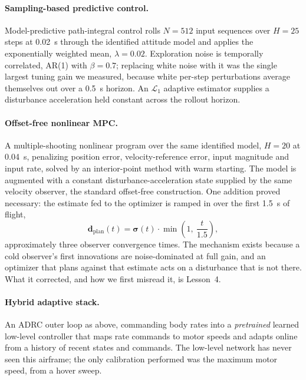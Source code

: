 \paragraph{Sampling-based predictive control.}
Model-predictive path-integral control\cite{williams2018mppi} rolls $N = 512$ input
sequences over $H = 25$ steps at \SI{0.02}{\second} through the identified attitude
model and applies the exponentially weighted mean, $\lambda = 0.02$. Exploration noise
is temporally correlated, AR(1) with $\beta = 0.7$; replacing white noise with it was
the single largest tuning gain we measured, because white per-step perturbations average
themselves out over a \SI{0.5}{\second} horizon. An $\mathcal{L}_1$ adaptive
estimator\cite{hovakimyan2010l1} supplies a disturbance acceleration held constant
across the rollout horizon.

\paragraph{Offset-free nonlinear MPC.}
A multiple-shooting nonlinear program over the same identified model, $H = 20$ at
\SI{0.04}{\second}, penalizing position error, velocity-reference error, input magnitude
and input rate, solved by an interior-point method with warm starting. The model is
augmented with a constant disturbance-acceleration state supplied by the same velocity
observer, the standard offset-free construction\cite{maeder2009offsetfree}. One addition
proved necessary: the estimate fed to the optimizer is ramped in over the first
\SI{1.5}{\second} of flight,
\begin{equation}
  \mathbf{d}_{\mathrm{plan}}(t) = \boldsymbol{\sigma}(t)\cdot\min\!\left(1,\ \frac{t}{1.5}\right),
  \label{eq:softstart}
\end{equation}
approximately three observer convergence times. The mechanism exists because a cold
observer's first innovations are noise-dominated at full gain, and an optimizer that
plans against that estimate acts on a disturbance that is not there. What it corrected,
and how we first misread it, is Lesson~4.

\paragraph{Hybrid adaptive stack.}
An ADRC outer loop as above, commanding body rates into a \emph{pretrained} learned
low-level controller\cite{zhang2025xadapt} that maps rate commands to motor speeds and
adapts online from a history of recent states and commands. The low-level network has
never seen this airframe; the only calibration performed was the maximum motor speed,
from a hover sweep.

